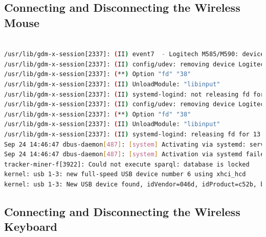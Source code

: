 \documentclass[11pt]{article}
\begin{document}
\subsection{Connecting and Disconnecting the Wireless Mouse}

\begin{lstlisting}[language=bash]

/usr/lib/gdm-x-session[2337]: (II) event7  - Logitech M585/M590: device removed
/usr/lib/gdm-x-session[2337]: (II) config/udev: removing device Logitech M585/M590
/usr/lib/gdm-x-session[2337]: (**) Option "fd" "38"
/usr/lib/gdm-x-session[2337]: (II) UnloadModule: "libinput"
/usr/lib/gdm-x-session[2337]: (II) systemd-logind: not releasing fd for 13:71, still in 
/usr/lib/gdm-x-session[2337]: (II) config/udev: removing device Logitech M585/M590
/usr/lib/gdm-x-session[2337]: (**) Option "fd" "38"
/usr/lib/gdm-x-session[2337]: (II) UnloadModule: "libinput"
/usr/lib/gdm-x-session[2337]: (II) systemd-logind: releasing fd for 13:71
Sep 24 14:46:47 dbus-daemon[487]: [system] Activating via systemd: service name='org.freedesktop.Avahi' unit='dbus-org.freedesktop.Avahi.service' requested by ':1.153' (uid=969 pid=7234 comm="/usr/lib/colord-sane")
Sep 24 14:46:47 dbus-daemon[487]: [system] Activation via systemd failed for unit 'dbus-org.freedesktop.Avahi.service': Unit dbus-org.freedesktop.Avahi.service not found.
tracker-miner-f[3922]: Could not execute sparql: database is locked
kernel: usb 1-3: new full-speed USB device number 6 using xhci_hcd
kernel: usb 1-3: New USB device found, idVendor=046d, idProduct=c52b, bcdDevice=12.11

\end{lstlisting}

\subsection{Connecting and Disconnecting the Wireless Keyboard}
\end{document}
